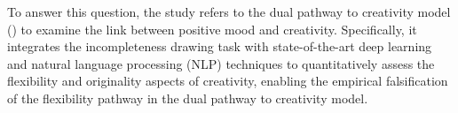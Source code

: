 \documentclass[../Proposal.tex]{subfiles}
\begin{document}
To answer this question, the study refers to the dual pathway to creativity model (\cite{de_dreu_hedonic_2008}) to examine the link between positive mood and creativity. Specifically, it integrates the incompleteness drawing task with state-of-the-art deep learning and natural language processing (NLP) techniques to quantitatively assess the flexibility and originality aspects of creativity, enabling the empirical falsification of the flexibility pathway in the dual pathway to creativity model.
\end{document}
